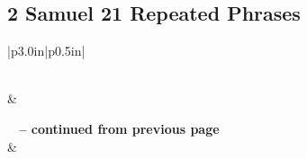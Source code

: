\subsection{2 Samuel 21 Repeated Phrases}


\normalsize
 
\begin{center}
\begin{longtable}{|p{3.0in}|p{0.5in}|}
\caption[2 Samuel 21 Repeated Phrases]{2 Samuel 21 Repeated Phrases}\label{table:Repeated Phrases 2 Samuel 21} \\
\hline {} &  \\ \hline 
\endfirsthead
 
{{\bfseries \tablename\ \thetable{} -- continued from previous page}} \\  
\hline {} &  \\ \hline 
\endhead
 

\end{longtable}
\end{center}
